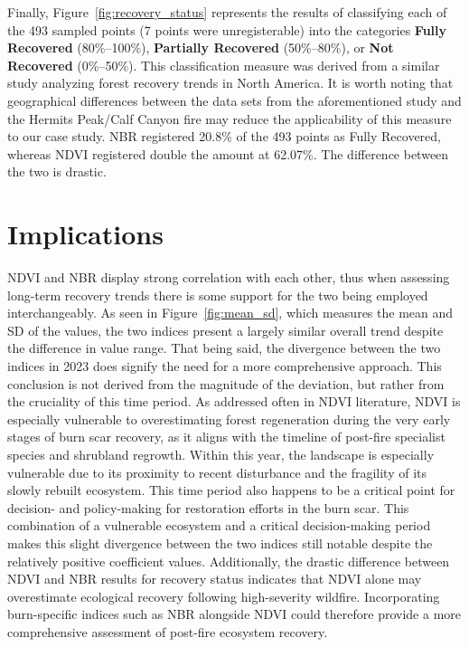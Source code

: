 \documentclass[11pt]{article}
\begin{document}
Finally, Figure~\ref{fig:recovery_status} represents the results of classifying each of the 493 sampled points (7 points were unregisterable) into the categories \textbf{Fully Recovered} (80\%--100\%), \textbf{Partially Recovered} (50\%--80\%), or \textbf{Not Recovered} (0\%--50\%). This classification measure was derived from a similar study analyzing forest recovery trends in North America. It is worth noting that geographical differences between the data sets from the aforementioned study and the Hermits Peak/Calf Canyon fire may reduce the applicability of this measure to our case study. NBR registered 20.8\% of the 493 points as Fully Recovered, whereas NDVI registered double the amount at 62.07\%. The difference between the two is drastic.

\section{Implications}

NDVI and NBR display strong correlation with each other, thus when assessing long-term recovery trends there is some support for the two being employed interchangeably. As seen in Figure~\ref{fig:mean_sd}, which measures the mean and SD of the values, the two indices present a largely similar overall trend despite the difference in value range. That being said, the divergence between the two indices in 2023 does signify the need for a more comprehensive approach. This conclusion is not derived from the magnitude of the deviation, but rather from the cruciality of this time period. As addressed often in NDVI literature, NDVI is especially vulnerable to overestimating forest regeneration during the very early stages of burn scar recovery, as it aligns with the timeline of post-fire specialist species and shrubland regrowth. Within this year, the landscape is especially vulnerable due to its proximity to recent disturbance and the fragility of its slowly rebuilt ecosystem. This time period also happens to be a critical point for decision- and policy-making for restoration efforts in the burn scar. This combination of a vulnerable ecosystem and a critical decision-making period makes this slight divergence between the two indices still notable despite the relatively positive coefficient values. Additionally, the drastic difference between NDVI and NBR results for recovery status indicates that NDVI alone may overestimate ecological recovery following high-severity wildfire. Incorporating burn-specific indices such as NBR alongside NDVI could therefore provide a more comprehensive assessment of post-fire ecosystem recovery.
\end{document}
